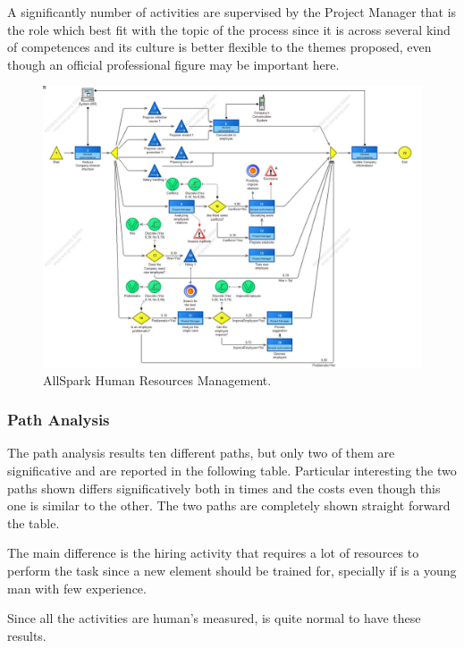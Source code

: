 A significantly number of activities are supervised by the Project Manager that is the role which best fit with the topic of the process since it is across several kind of competences and its culture is better flexible to the themes proposed, even though an official professional figure may be important here.

\begin{figure}[ht!]
\begin{centering}
\includegraphics[scale=0.35, angle=90]{assign2/adonis/imgs/human_resources.jpg}
\caption{AllSpark Human Resources Management.}
\label{2img:human_resources}
\end{centering}
\end{figure}


\subsubsection{Path Analysis}
The path analysis results ten different paths, but only two of them are significative and are reported in the following table. Particular interesting the two paths shown differs significatively both in times and the costs even though this one is similar to the other. The two paths are completely shown straight forward the table.

The main difference is the hiring activity that requires a lot of resources to perform the task since a new element should be trained for, specially if is a young man with few experience.

Since all the activities are human's measured, is quite normal to have these results.

